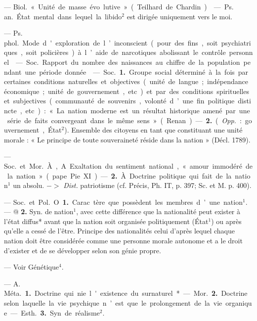 
	\begin{itemize}[leftmargin=1cm, label=, itemsep=1pt]

 — \si{Biol.} « Unité de masse évo
lutive » (Teilhard de Chardin).

 — \si{Ps. an.} État mental
dans lequel la libido$^2$ est dirigée
uniquement vers le moi.

 — \si{Ps. phol.} Mode
d'exploration de l’inconscient (pour
des fins, soit psychiatriques, soit
policières) à l’aide de narcotiques
abolissant le contrôle personnel.

 — \si{Soc.} Rapport du nombre
des naissances au chiffre de la
population pendant une période
donnée.

 — \si{Soc.} {\bf 1.} Groupe social déterminé à la fois par certaines conditions naturelles et objectives (unité
de langue ; indépendance économique ; unité de gouvernement, etc.) et
par des conditions spirituelles et
subjectives (communauté de souvenirs, volonté d’une fin politique
distincte, etc.) : « La nation moderne est un résultat historique
amené par une série de faits convergeant dans le même sens » (Renan).
— {\bf 2.} ({\it Opp.} : gouvernement, État$^2$).
Ensemble des citoyens en tant que
constituant une unité morale : « Le
principe de toute souveraineté réside dans la nation » (Décl. 1789).

 — \si{Soc.} et \si{Mor.} À, A.
Exaltation du sentiment national,
« amour immodéré de la nation »
(pape Pie XI). — {\bf 2.} À. Doctrine politique qui fait de la nation$^1$ un
absolu. $->$ {\it Dist.} patriotisme (cf.
Précis, Ph. IT, p. 397; Sc. et M.
p. 400).

 — \si{Soc.} et \si{Pol.} O {\bf 1.} Carac
tère que possèdent les membres
d’une nation$^1$. — @ {\bf 2.} Syn. de nation$^1$,
avec cette différence que la nationalité peut exister à l’état diffus*
avant que la nation soit organisée
politiquement (État$^1$) ou après
qu’elle a cessé de l’être. Principe des
nationalités celui d’après lequel
chaque nation doit être considérée
comme une personne morale autonome et a le droit d’exister et de se
développer selon son génie propre.

 — Voir Génétique$^4$.

 — A. \si{Méta.} {\bf 1.} Doctrine
qui nie l'existence du surnaturel*.
— \si{Mor.} {\bf 2.} Doctrine selon laquelle
la vie psychique n’est que le prolongement de la vie organique. —
\si{Esth.} {\bf 3.} Syn. de réalisme$^2$.


\end{itemize}
